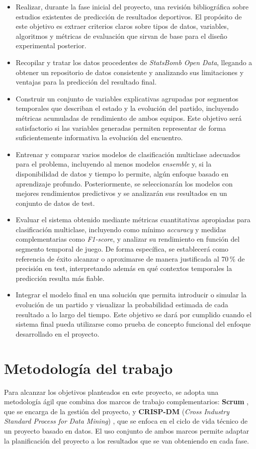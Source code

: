 \begin{itemize}
    \item Realizar, durante la fase inicial del proyecto, una revisión bibliográfica sobre estudios existentes de predicción de resultados deportivos. El propósito de este objetivo es extraer criterios claros sobre tipos de datos, variables, algoritmos y métricas de evaluación que sirvan de base para el diseño experimental posterior.
    \item Recopilar y tratar los datos procedentes de \textit{StatsBomb Open Data}, llegando a obtener un repositorio de datos consistente y analizando sus limitaciones y ventajas para la predicción del resultado final.
    \item Construir un conjunto de variables explicativas agrupadas por segmentos temporales que describan el estado y la evolución del partido, incluyendo métricas acumuladas de rendimiento de ambos equipos. Este objetivo será satisfactorio si las variables generadas permiten representar de forma suficientemente informativa la evolución del encuentro.
    \item Entrenar y comparar varios modelos de clasificación multiclase adecuados para el problema, incluyendo al menos modelos \textit{ensemble} y, si la disponibilidad de datos y tiempo lo permite, algún enfoque basado en aprendizaje profundo. Posteriormente, se seleccionarán los modelos con mejores rendimientos predictivos y se analizarán sus resultados en un conjunto de datos de test.
    \item Evaluar el sistema obtenido mediante métricas cuantitativas apropiadas para clasificación multiclase, incluyendo como mínimo \textit{accuracy} y medidas complementarias como \textit{F1-score}, y analizar su rendimiento en función del segmento temporal de juego. De forma específica, se establecerá como referencia de éxito alcanzar o aproximarse de manera justificada al 70\,\% de precisión en test, interpretando además en qué contextos temporales la predicción resulta más fiable.
    \item Integrar el modelo final en una solución que permita introducir o simular la evolución de un partido y visualizar la probabilidad estimada de cada resultado a lo largo del tiempo. Este objetivo se dará por cumplido cuando el sistema final pueda utilizarse como prueba de concepto funcional del enfoque desarrollado en el proyecto.
\end{itemize}

\section{Metodología del trabajo}
Para alcanzar los objetivos planteados en este proyecto, se adopta una metodología ágil que combina dos marcos de trabajo complementarios: \textbf{Scrum} \citep{schwaber2020scrum}, que se encarga de la gestión del proyecto, y \textbf{CRISP-DM} (\textit{Cross Industry Standard Process for Data Mining}) \citep{chapman2000crispdm}, que se enfoca en el ciclo de vida técnico de un proyecto basado en datos. El uso conjunto de ambos marcos permite adaptar la planificación del proyecto a los resultados que se van obteniendo en cada fase.

